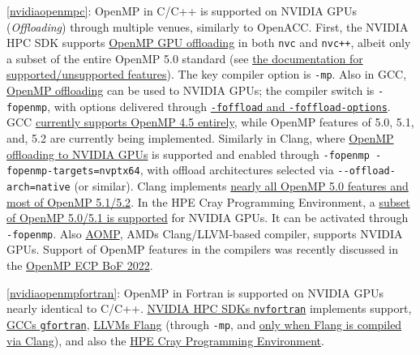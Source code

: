 \item \ref{nvidiaopenmpc}: OpenMP in C/C++ is supported on NVIDIA GPUs (\emph{Offloading}) through multiple venues, similarly to OpenACC. First, the NVIDIA HPC SDK supports \href{https://docs.nvidia.com/hpc-sdk/compilers/hpc-compilers-user-guide/index.html\#openmp-use}{OpenMP GPU offloading} in both \texttt{nvc} and \texttt{nvc++}, albeit only a subset of the entire OpenMP 5.0 standard (see \href{https://docs.nvidia.com/hpc-sdk/compilers/hpc-compilers-user-guide/index.html\#openmp-subset}{the documentation for supported/unsupported features}). The key compiler option is \texttt{-mp}. Also in GCC, \href{https://gcc.gnu.org/wiki/Offloading}{OpenMP offloading} can be used to NVIDIA GPUs; the compiler switch is \texttt{-fopenmp}, with options delivered through \href{https://gcc.gnu.org/onlinedocs/gcc/C-Dialect-Options.html\#index-foffload}{\texttt{-foffload} and \texttt{-foffload-options}}. GCC \href{https://gcc.gnu.org/onlinedocs/gcc-13.1.0/libgomp/OpenMP-Implementation-Status.html}{currently supports OpenMP 4.5 entirely}, while OpenMP features of 5.0, 5.1, and, 5.2 are currently being implemented. Similarly in Clang, where \href{https://clang.llvm.org/docs/OffloadingDesign.html}{OpenMP offloading to NVIDIA GPUs} is supported and enabled through \texttt{-fopenmp\ -fopenmp-targets=nvptx64}, with offload architectures selected via \texttt{-\/-offload-arch=native} (or similar). Clang implements \href{https://clang.llvm.org/docs/OpenMPSupport.html\#openmp-implementation-details}{nearly all OpenMP 5.0 features and most of OpenMP 5.1/5.2}. In the HPE Cray Programming Environment, a \href{https://cpe.ext.hpe.com/docs/cce/man7/intro_openmp.7.html}{subset of OpenMP 5.0/5.1 is supported} for NVIDIA GPUs. It can be activated through \texttt{-fopenmp}. Also \href{https://github.com/ROCm-Developer-Tools/aomp/}{AOMP}, AMD\textquotesingle s Clang/LLVM-based compiler, supports NVIDIA GPUs. Support of OpenMP features in the compilers was recently discussed in the \href{https://www.openmp.org/wp-content/uploads/2022_ECP_Community_BoF_Days-OpenMP_RoadMap_BoF.pdf}{OpenMP ECP BoF 2022}.
\item \ref{nvidiaopenmpfortran}: OpenMP in Fortran is supported on NVIDIA GPUs nearly identical to C/C++. \href{https://docs.nvidia.com/hpc-sdk/compilers/hpc-compilers-user-guide/index.html\#openmp-use}{NVIDIA HPC SDK\textquotesingle s \texttt{nvfortran}} implements support, \href{https://gcc.gnu.org/wiki/openmp}{GCC\textquotesingle s \texttt{gfortran}}, \href{https://flang.llvm.org/docs/}{LLVM\textquotesingle s Flang} (through \texttt{-mp}, and \href{https://flang.llvm.org/docs/GettingStarted.html\#openmp-target-offload-build}{only when Flang is compiled via Clang}), and also the \href{https://cpe.ext.hpe.com/docs/cce/man7/intro_openmp.7.html}{HPE Cray Programming Environment}.
